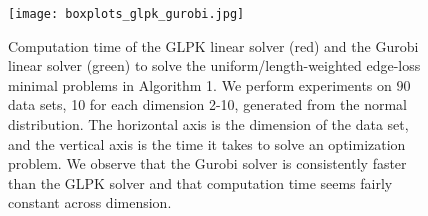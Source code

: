 
 \begin{figure}[h!]
 \begin{center}
 \texttt{[image: boxplots\_glpk\_gurobi.jpg]}%
 \end{center}
 \caption{Computation time of the GLPK linear solver (red) and the Gurobi linear solver (green) to solve the uniform/length-weighted edge-loss minimal problems in Algorithm 1. We perform experiments on $90$ data sets, 10 for each dimension 2-10, generated from the normal distribution. The horizontal axis is the dimension of the data set, and the vertical axis is the time it takes to solve an optimization problem. We observe that the Gurobi solver is consistently faster than the GLPK solver and that computation time seems fairly constant across dimension.}\label{fig:glpk_gurobi}
 \end{figure}

